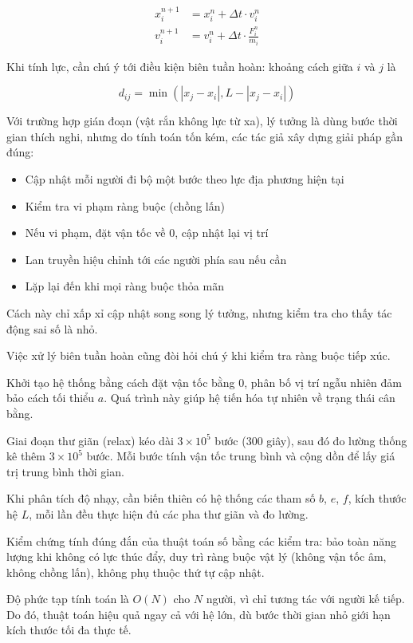 \documentclass[12pt,a4paper]{article}
\begin{document}
\begin{align}
x_i^{n+1} &= x_i^n + \Delta t \cdot v_i^n \\
v_i^{n+1} &= v_i^n + \Delta t \cdot \frac{F_i^n}{m_i}
\end{align}

Khi tính lực, cần chú ý tới điều kiện biên tuần hoàn: khoảng cách giữa $i$ và $j$ là

\begin{equation}
d_{ij} = \min(|x_j - x_i|, L - |x_j - x_i|)
\end{equation}

Với trường hợp gián đoạn (vật rắn không lực từ xa), lý tưởng là dùng bước thời gian thích nghi, nhưng do tính toán tốn kém, các tác giả xây dựng giải pháp gần đúng:

\begin{itemize}
\item Cập nhật mỗi người đi bộ một bước theo lực địa phương hiện tại
\item Kiểm tra vi phạm ràng buộc (chồng lấn)
\item Nếu vi phạm, đặt vận tốc về 0, cập nhật lại vị trí
\item Lan truyền hiệu chỉnh tới các người phía sau nếu cần
\item Lặp lại đến khi mọi ràng buộc thỏa mãn
\end{itemize}

Cách này chỉ xấp xỉ cập nhật song song lý tưởng, nhưng kiểm tra cho thấy tác động sai số là nhỏ.

Việc xử lý biên tuần hoàn cũng đòi hỏi chú ý khi kiểm tra ràng buộc tiếp xúc.

Khởi tạo hệ thống bằng cách đặt vận tốc bằng 0, phân bố vị trí ngẫu nhiên đảm bảo cách tối thiểu $a$. Quá trình này giúp hệ tiến hóa tự nhiên về trạng thái cân bằng.

Giai đoạn thư giãn (relax) kéo dài $3 \times 10^5$ bước (300 giây), sau đó đo lường thống kê thêm $3 \times 10^5$ bước. Mỗi bước tính vận tốc trung bình và cộng dồn để lấy giá trị trung bình thời gian.

Khi phân tích độ nhạy, cần biến thiên có hệ thống các tham số $b$, $e$, $f$, kích thước hệ $L$, mỗi lần đều thực hiện đủ các pha thư giãn và đo lường.

Kiểm chứng tính đúng đắn của thuật toán số bằng các kiểm tra: bảo toàn năng lượng khi không có lực thúc đẩy, duy trì ràng buộc vật lý (không vận tốc âm, không chồng lấn), không phụ thuộc thứ tự cập nhật.

Độ phức tạp tính toán là $O(N)$ cho $N$ người, vì chỉ tương tác với người kế tiếp. Do đó, thuật toán hiệu quả ngay cả với hệ lớn, dù bước thời gian nhỏ giới hạn kích thước tối đa thực tế.
\end{document}

